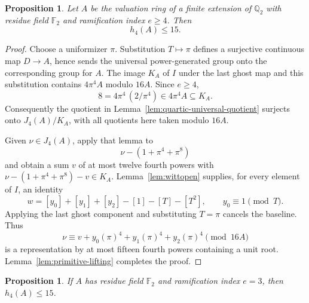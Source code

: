 \documentclass[11pt]{amsart}
\newtheorem{proposition}[theorem]{Proposition}
\theoremstyle{definition}
\numberwithin{equation}{section}
\begin{document}
\begin{proposition}\label{prop:quartic-high-ramification}
Let $A$ be the valuation ring of a finite extension of $\mathbb Q_2$
with residue field $\mathbb F_2$ and ramification index $e\ge4$.
Then
\[
 h_4(A)\le15.
\]
\end{proposition}

\begin{proof}
Choose a uniformizer $\pi$.  Substitution $T\mapsto\pi$ defines a
surjective continuous map $D\to A$, hence sends the universal
power-generated group onto the corresponding group for $A$.
The image $K_A$ of $I$ under the last ghost map and this substitution
contains $4\pi^4A$ modulo $16A$.  Since $e\ge4$,
\[
 8=4\pi^4\,(2/\pi^4)\in4\pi^4A\subseteq K_A.
\]
Consequently the quotient in Lemma~\ref{lem:quartic-universal-quotient}
surjects onto $J_4(A)/K_A$, with all quotients here taken modulo $16A$.

Given $\nu\in J_4(A)$, apply that lemma to
\[
 \nu-(1+\pi^4+\pi^8)
\]
and obtain a sum $v$ of at most twelve fourth powers with
$\nu-(1+\pi^4+\pi^8)-v\in K_A$.
Lemma~\ref{lem:wittopen} supplies, for every element
of $I$, an identity
\[
 w=[y_0]+[y_1]+[y_2]-[1]-[T]-[T^2],
 \qquad y_0\equiv1\pmod T.
\]
Applying the last ghost component and substituting $T=\pi$ cancels
the baseline.  Thus
\[
 \nu\equiv v+y_0(\pi)^4+y_1(\pi)^4+y_2(\pi)^4\pmod {16A}
\]
is a representation by at most fifteen fourth powers containing a
unit root.  Lemma~\ref{lem:primitive-lifting} completes the proof.
\end{proof}


\begin{proposition}\label{prop:quartic-cubic-ramification}
If $A$ has residue field $\mathbb F_2$ and ramification index $e=3$,
then $h_4(A)\le15$.
\end{proposition}
\end{document}
